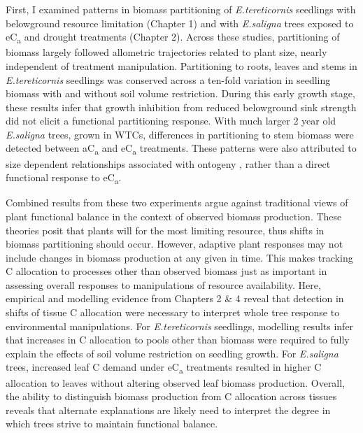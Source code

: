 \documentclass[a4paper]{article}
\begin{document}
First, I examined patterns in biomass partitioning of \textit{E.tereticornis} seedlings with belowground resource limitation (Chapter 1) and with \textit{E.saligna} trees exposed to eC\textsubscript{a} and drought treatments (Chapter 2). Across these studies, partitioning of biomass largely followed allometric trajectories related to plant size, nearly independent of treatment manipulation. Partitioning to roots, leaves and stems in \textit{E.tereticornis} seedlings was conserved across a ten-fold variation in seedling biomass with and without soil volume restriction. During this early growth stage, these results infer that growth inhibition from reduced belowground sink strength did not elicit a functional partitioning response. With much larger 2 year old \textit{E.saligna} trees, grown in WTCs, differences in partitioning to stem biomass were detected between aC\textsubscript{a} and eC\textsubscript{a} treatments. These patterns were also attributed to size dependent relationships associated with ontogeny \citep[see]{poorter2015does}, rather than a direct functional response to eC\textsubscript{a}.

Combined results from these two experiments argue against traditional views of plant functional balance in the context of observed biomass production. These theories posit that plants will  for the most limiting resource, thus shifts in biomass partitioning should occur. However, adaptive plant responses may not include changes in biomass production at any given  in time.  This makes tracking C allocation to processes other than observed biomass just as important in assessing overall responses to manipulations of resource availability. Here, empirical and modelling evidence from Chapters 2 \& 4 reveal that detection in shifts of tissue C allocation were necessary to interpret whole tree response to environmental manipulations. For \textit{E.tereticornis} seedlings, modelling results infer that increases in C allocation to pools other than biomass were required to fully explain the effects of soil volume restriction on seedling growth. For \textit{E.saligna} trees, increased leaf C demand under eC\textsubscript{a} treatments resulted in higher C allocation to leaves without altering observed leaf biomass production. Overall, the ability to distinguish biomass production from C allocation across tissues reveals that alternate explanations are likely need to interpret the degree in which trees strive to maintain functional balance.
\end{document}
